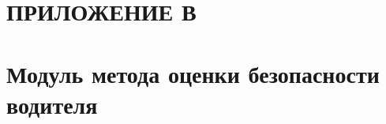 \section*{ПРИЛОЖЕНИЕ В}
\section*{Модуль метода оценки безопасности водителя}
\setcounter{lstlisting}{0}
\renewcommand{\thelstlisting}{В.\arabic{lstlisting}} %

